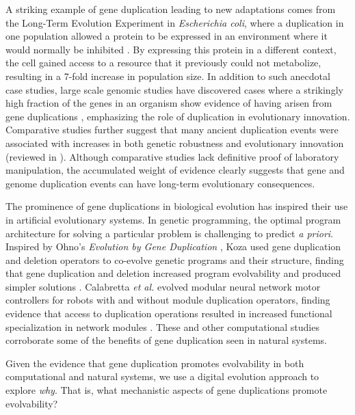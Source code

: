 A striking example of gene duplication leading to new adaptations
comes from the Long-Term Evolution Experiment in \textit{Escherichia coli}, where a duplication in one population allowed a protein to be expressed in an environment where it would normally be inhibited \citep{blount_genomic_2012}.
By expressing this protein in a different context, the cell gained access to a resource that it previously could not metabolize, resulting in a 7-fold increase in population size.
In addition to such anecdotal case studies, large scale genomic studies have discovered cases where a strikingly high fraction of the genes in an organism show evidence of having arisen from gene duplications \citep{teichmann_structural_1998,Teichmann:2004cz}, emphasizing the role of duplication in evolutionary innovation.
Comparative studies further suggest that many ancient duplication events were associated with increases in both genetic robustness and evolutionary innovation (reviewed in \citep{wagner_gene_2008}).
Although comparative studies lack definitive proof of laboratory manipulation, the accumulated weight of evidence clearly suggests that gene and genome duplication events can have long-term evolutionary consequences.

The prominence of gene duplications in biological evolution has inspired their use in artificial evolutionary systems.
In genetic programming, the optimal program architecture for solving a particular problem is challenging to predict \textit{a priori}.
Inspired by Ohno's \textit{Evolution by Gene Duplication} \citep{ohno1970evolution}, Koza used gene duplication and deletion operators to co-evolve genetic programs and their structure, finding that gene duplication and deletion increased program evolvability and produced simpler solutions \citep{Koza:1995fr}.
Calabretta \textit{et al.} evolved modular neural network motor controllers for robots with and without module duplication operators, finding evidence that access to duplication operations resulted in increased functional specialization in network modules \citep{Calabretta:1998vh,Calabretta:2000tl}.
These and other computational studies \citep{Ryan:1998gm,Sawai:1999genetic,Sawai:2000comparative,Schmitt:2005bc} corroborate some of the benefits of gene duplication seen in natural systems.

Given the evidence that gene duplication promotes evolvability in both computational and natural systems, we use a digital evolution approach to explore \textit{why}.
That is, what mechanistic aspects of gene duplications promote evolvability?

